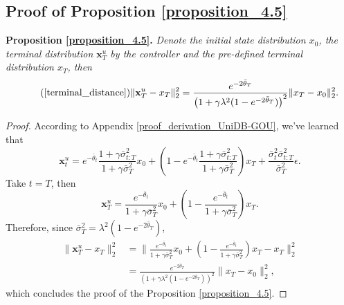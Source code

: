 \subsection{Proof of Proposition \ref{proposition_4.5}}\label{proof_proposition_4.5}
\noindent \textbf{Proposition \ref{proposition_4.5}.} \textit{Denote the initial state distribution $x_0$, the terminal distribution $\mathbf{x}_T^u$ by the controller and the pre-defined terminal distribution $x_T$, then}
\begin{equation}\tag{\ref{terminal_distance}}
    \| \mathbf{x}_T^u - x_T \|^2_2 = \frac{e^{-2\bar{\theta}_{T}}}{\left(1 + \gamma \lambda^2 (1 - e^{-2\bar{\theta}_{T}}) \right)^2} \| x_T - x_0 \|^2_2 .
\end{equation}

\begin{proof}
According to Appendix \ref{proof_derivation_UniDB-GOU}, we've learned that 
\begin{equation}
\mathbf{x}_t^u = e^{-\bar{\theta}_{t}} \frac{1 + \gamma \bar{\sigma}^2_{t:T}}{1 + \gamma \bar{\sigma}^2_{T}} x_0 + \left(1 - e^{-\bar{\theta}_{t}} \frac{1 + \gamma \bar{\sigma}^2_{t:T}}{1 + \gamma \bar{\sigma}^2_{T}}\right) x_T + 
\frac{\bar{\sigma}_t^2\bar{\sigma}_{t:T}^2}{\bar{\sigma}_T^2} \epsilon.
\end{equation}
Take $t = T$, then
\begin{equation}
\mathbf{x}_T^u = \frac{e^{-\bar{\theta}_{t}}}{1 + \gamma \bar{\sigma}^2_{T}} x_0 + \left(1 - \frac{e^{-\bar{\theta}_{t}}}{1 + \gamma \bar{\sigma}^2_{T}}\right) x_T.
\end{equation}
Therefore, since $\bar{\sigma}^2_{T} = \lambda^2 (1 - e^{-2\bar{\theta}_{T}})$, 
\begin{equation}
\begin{split}
\| \mathbf{x}_T^u - x_T \|^2_2
&= \Big\| \frac{e^{-\bar{\theta}_{t}}}{1 + \gamma \bar{\sigma}^2_{T}} x_0 + \left(1 - \frac{e^{-\bar{\theta}_{t}}}{1 + \gamma \bar{\sigma}^2_{T}}\right) x_T - x_T \Big\|^2_2 \\
&= \frac{e^{-2\bar{\theta}_{T}}}{\left(1 + \gamma \lambda^2 (1 - e^{-2\bar{\theta}_{T}}) \right)^2} \| x_T - x_0 \|^2_2 ,
\end{split}
\end{equation}
which concludes the proof of the Proposition \ref{proposition_4.5}.
\end{proof}




